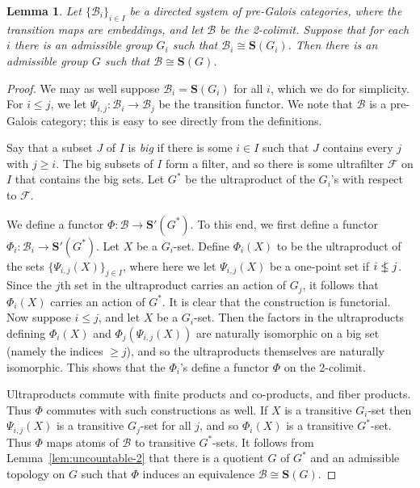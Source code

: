 \documentclass[12pt]{amsart}
\numberwithin{equation}{section}
\newtheorem{lemma}[equation]{Lemma}
\theoremstyle{definition}
\newcommand{\cB}{\mathcal{B}}
\newcommand{\cF}{\mathcal{F}}
\newcommand{\bS}{\mathbf{S}}
\newcommand{\nlet}{%
  \mathrel{\ooalign{$\le$\cr\hidewidth$|$\hidewidth}}%
}
\newcommand{\defn}[1]{\emph{#1}}
\begin{document}
\begin{lemma} \label{lem:uncountable-3}
Let $\{\cB_i\}_{i \in I}$ be a directed system of pre-Galois categories, where the transition maps are embeddings, and let $\cB$ be the 2-colimit. Suppose that for each $i$ there is an admissible group $G_i$ such that $\cB_i \cong \bS(G_i)$. Then there is an admissible group $G$ such that $\cB \cong \bS(G)$.
\end{lemma}

\begin{proof}
We may as well suppose $\cB_i=\bS(G_i)$ for all $i$, which we do for simplicity. For $i \le j$, we let $\Psi_{i,j} \colon \cB_i \to \cB_j$ be the transition functor. We note that $\cB$ is a pre-Galois category; this is easy to see directly from the definitions.

Say that a subset $J$ of $I$ is \defn{big} if there is some $i \in I$ such that $J$ contains every $j$ with $j \ge i$. The big subsets of $I$ form a filter, and so there is some ultrafilter $\cF$ on $I$ that contains the big sets. Let $G^*$ be the ultraproduct of the $G_i$'s with respect to $\cF$.

We define a functor $\Phi \colon \cB \to \bS'(G^*)$. To this end, we first define a functor $\Phi_i \colon \cB_i \to \bS'(G^*)$. Let $X$ be a $G_i$-set. Define $\Phi_i(X)$ to be the ultraproduct of the sets $\{ \Psi_{i,j}(X) \}_{j \in I}$, where here we let $\Psi_{i,j}(X)$ be a one-point set if $i \nlet j$. Since the $j$th set in the ultraproduct carries an action of $G_j$, it follows that $\Phi_i(X)$ carries an action of $G^*$. It is clear that the construction is functorial. Now suppose $i \le j$, and let $X$ be a $G_i$-set. Then the factors in the ultraproducts defining $\Phi_i(X)$ and $\Phi_j(\Psi_{i,j}(X))$ are naturally isomorphic on a big set (namely the indices $\ge j$), and so the ultraproducts themselves are naturally isomorphic. This shows that the $\Phi_i$'s define a functor $\Phi$ on the 2-colimit.

Ultraproducts commute with finite products and co-products, and fiber products. Thus $\Phi$ commutes with such constructions as well. If $X$ is a transitive $G_i$-set then $\Psi_{i,j}(X)$ is a transitive $G_j$-set for all $j$, and so $\Phi_i(X)$ is a transitive $G^*$-set. Thus $\Phi$ maps atoms of $\cB$ to transitive $G^*$-sets. It follows from Lemma~\ref{lem:uncountable-2} that there is a quotient $G$ of $G^*$ and an admissible topology on $G$ such that $\Phi$ induces an equivalence $\cB \cong \bS(G)$.
\end{proof}
\end{document}
